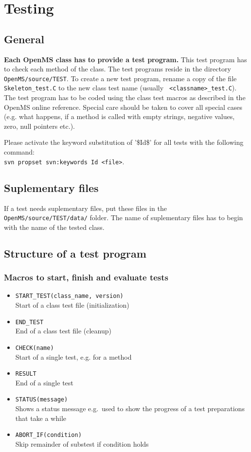 \documentclass[a4]{article}
\begin{document}
\section{Testing}

\subsection{General}

{\bf Each OpenMS class has to provide a test program.} This test program has to check
each method of the class. The test programs reside in the directory
{\tt OpenMS/source/TEST}. To create a new test program, rename a copy of the file
{\tt Skeleton\_test.C} to the new class test name (usually {\tt
<classname>\_test.C}). The test program has to be coded using the class test
macros as described in the OpenMS online reference. Special care should be taken
to cover all special cases (e.g. what happens, if a method is called with
empty strings, negative values, zero, null pointers etc.).

Please activate the keyword substitution of '\$Id\$' for all tests with the following command:\\
{\tt svn propset svn:keywords Id <file>}.

\subsection{Suplementary files}
If a test needs suplementary files, put these files in the {\tt OpenMS/source/TEST/data/} folder.
The name of suplementary files has to begin with the name of the tested class.

\subsection{Structure of a test program}

\subsubsection{Macros to start, finish and evaluate tests}
\begin{itemize}
        \item {\tt START\_TEST(class\_name, version)} \\ Start of a class test file (initialization)
        \item {\tt END\_TEST} \\ End of a class test file (cleanup)
        \item {\tt CHECK(name)} \\ Start of a single test, e.g. for a method
        \item {\tt RESULT} \\ End of a single test
        \item {\tt STATUS(message)} \\ Shows a status message e.g.\ used to show the progress of a test preparations that take a while
        \item {\tt ABORT\_IF(condition)} \\ Skip remainder of substest if condition holds
\end{itemize}
\end{document}
